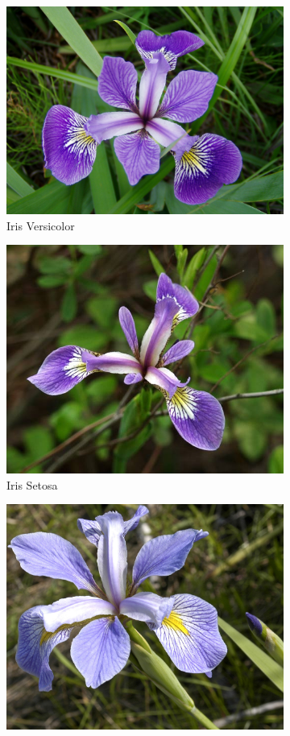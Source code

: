 \documentclass[11pt]{article}
\begin{document}
\begin{figure}[H]
 \centering
 \begin{subfigure}{0.32\textwidth}
  \includegraphics[width=0.9\linewidth]{../images/iris_versicolor.jpg}
  \caption{Iris Versicolor}
 \end{subfigure}
 \begin{subfigure}{0.32\textwidth}
  \includegraphics[width=0.9\linewidth]{../images/iris_setosa.jpg}
  \caption{Iris Setosa}
 \end{subfigure}
 \begin{subfigure}{0.32\textwidth}
  \includegraphics[width=0.9\linewidth]{../images/iris_virginica.jpg}

\end{subfigure}
\end{figure}
\end{document}
